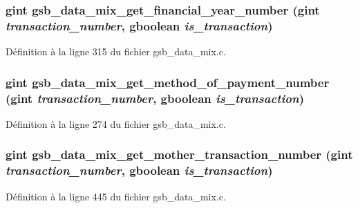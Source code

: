 \subsubsection[{gsb\_\-data\_\-mix\_\-get\_\-financial\_\-year\_\-number}]{\setlength{\rightskip}{0pt plus 5cm}gint gsb\_\-data\_\-mix\_\-get\_\-financial\_\-year\_\-number (gint {\em transaction\_\-number}, \/  gboolean {\em is\_\-transaction})}\label{gsb__data__mix_8c_a963227d3abcb625b80b421a19801a0a5}


Définition à la ligne 315 du fichier gsb\_\-data\_\-mix.c.

\subsubsection[{gsb\_\-data\_\-mix\_\-get\_\-method\_\-of\_\-payment\_\-number}]{\setlength{\rightskip}{0pt plus 5cm}gint gsb\_\-data\_\-mix\_\-get\_\-method\_\-of\_\-payment\_\-number (gint {\em transaction\_\-number}, \/  gboolean {\em is\_\-transaction})}\label{gsb__data__mix_8c_adfdc384233ca30c861e7b1673034fcf6}


Définition à la ligne 274 du fichier gsb\_\-data\_\-mix.c.

\subsubsection[{gsb\_\-data\_\-mix\_\-get\_\-mother\_\-transaction\_\-number}]{\setlength{\rightskip}{0pt plus 5cm}gint gsb\_\-data\_\-mix\_\-get\_\-mother\_\-transaction\_\-number (gint {\em transaction\_\-number}, \/  gboolean {\em is\_\-transaction})}\label{gsb__data__mix_8c_a92077f6b914030fd23025b5083687ee7}


Définition à la ligne 445 du fichier gsb\_\-data\_\-mix.c.

